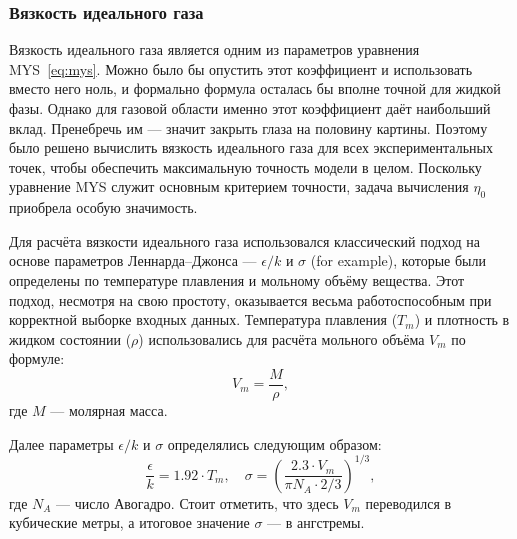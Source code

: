 \documentclass[a4paper,12pt]{article}
\begin{document}
    \subsubsection{Вязкость идеального газа}
      Вязкость идеального газа является одним из параметров уравнения MYS~\eqref{eq:mys}. Можно было бы опустить этот коэффициент и использовать вместо него ноль, и формально формула осталась бы вполне точной для жидкой фазы. Однако для газовой области именно этот коэффициент даёт наибольший вклад. Пренебречь им — значит закрыть глаза на половину картины. Поэтому было решено вычислить вязкость идеального газа для всех экспериментальных точек, чтобы обеспечить максимальную точность модели в целом. Поскольку уравнение MYS служит основным критерием точности, задача вычисления $\eta_0$ приобрела особую значимость.

      Для расчёта вязкости идеального газа использовался классический подход на основе параметров Леннарда--Джонса — $\epsilon/k$ и $\sigma$ (for example), которые были определены по температуре плавления и мольному объёму вещества. Этот подход, несмотря на свою простоту, оказывается весьма работоспособным при корректной выборке входных данных. Температура плавления ($T_m$) и плотность в жидком состоянии ($\rho$) использовались для расчёта мольного объёма $V_m$ по формуле:
      \[
      V_m = \frac{M}{\rho},
      \]
      где $M$ — молярная масса.
      
      Далее параметры $\epsilon/k$ и $\sigma$ определялись следующим образом:
      \[
      \frac{\epsilon}{k} = 1.92 \cdot T_m, \quad 
      \sigma = \left( \frac{2.3 \cdot V_m}{\pi N_A \cdot 2/3} \right)^{1/3},
      \]
      где $N_A$ — число Авогадро. Стоит отметить, что здесь $V_m$ переводился в кубические метры, а итоговое значение $\sigma$ — в ангстремы.
     
\end{document}
